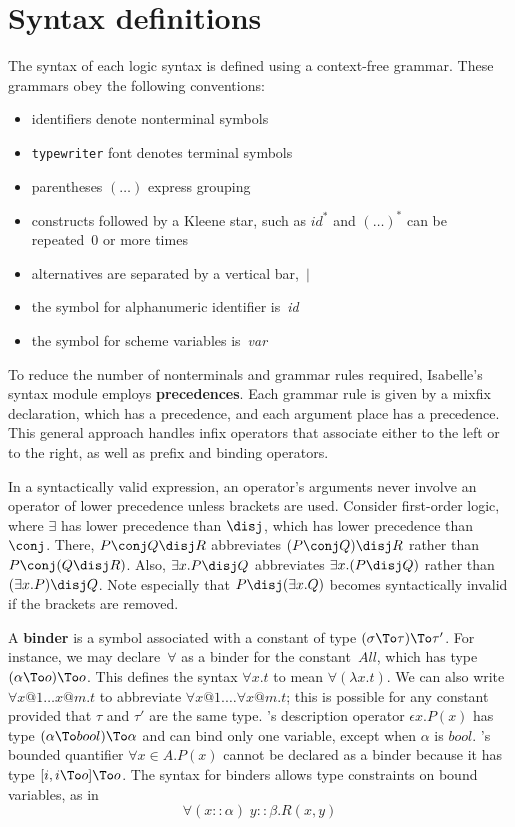 \section{Syntax definitions}
The syntax of each logic syntax is defined using a context-free grammar.
These grammars obey the following conventions:
\begin{itemize}
\item identifiers denote nonterminal symbols
\item {\tt typewriter} font denotes terminal symbols
\item parentheses $(\ldots)$ express grouping
\item constructs followed by a Kleene star, such as $id^*$ and $(\ldots)^*$
can be repeated~0 or more times 
\item alternatives are separated by a vertical bar,~$|$
\item the symbol for alphanumeric identifier is~{\it id\/} 
\item the symbol for scheme variables is~{\it var}
\end{itemize}
To reduce the number of nonterminals and grammar rules required, Isabelle's
syntax module employs {\bf precedences}.  Each grammar rule is given by a
mixfix declaration, which has a precedence, and each argument place has a
precedence.  This general approach handles infix operators that associate
either to the left or to the right, as well as prefix and binding
operators.

In a syntactically valid expression, an operator's arguments never involve
an operator of lower precedence unless brackets are used.  Consider
first-order logic, where $\exists$ has lower precedence than $\disj$,
which has lower precedence than $\conj$.  There, $P\conj Q \disj R$
abbreviates $(P\conj Q) \disj R$ rather than $P\conj (Q\disj R)$.  Also,
$\exists x.P\disj Q$ abbreviates $\exists x.(P\disj Q)$ rather than
$(\exists x.P)\disj Q$.  Note especially that $P\disj(\exists x.Q)$
becomes syntactically invalid if the brackets are removed.

A {\bf binder} is a symbol associated with a constant of type
$(\sigma\To\tau)\To\tau'$.  For instance, we may declare~$\forall$ as a
binder for the constant~$All$, which has type $(\alpha\To o)\To o$.  This
defines the syntax $\forall x.t$ to mean $\forall(\lambda x.t)$.  We can
also write $\forall x@1\ldots x@m.t$ to abbreviate $\forall x@1.  \ldots
\forall x@m.t$; this is possible for any constant provided that $\tau$ and
$\tau'$ are the same type.  \HOL's description operator $\epsilon x.P(x)$
has type $(\alpha\To bool)\To\alpha$ and can bind only one variable, except
when $\alpha$ is $bool$.  \ZF's bounded quantifier $\forall x\in A.P(x)$
cannot be declared as a binder because it has type $[i, i\To o]\To o$.  The
syntax for binders allows type constraints on bound variables, as in
\[ \forall (x{::}\alpha) \; y{::}\beta. R(x,y) \]

